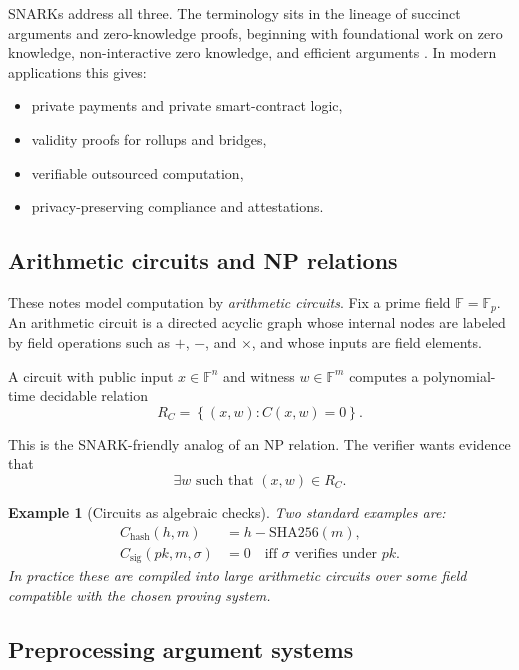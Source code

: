 \documentclass[11pt]{article}
\newcommand{\F}{\mathbb{F}}
\newcommand{\set}[1]{\left\{#1\right\}}
\newtheorem{example}{Example}
\begin{document}
SNARKs address all three. The terminology sits in the lineage of succinct arguments and zero-knowledge proofs, beginning with foundational work on zero knowledge, non-interactive zero knowledge, and efficient arguments \cite{GoldwasserMicaliRackoff1989,BlumFeldmanMicali1988,Kilian1992}. In modern applications this gives:
\begin{itemize}[leftmargin=2em]
    \item private payments and private smart-contract logic,
    \item validity proofs for rollups and bridges,
    \item verifiable outsourced computation,
    \item privacy-preserving compliance and attestations.
\end{itemize}

\subsection{Arithmetic circuits and NP relations}

These notes model computation by \emph{arithmetic circuits}. Fix a prime field $\F=\F_p$. An arithmetic circuit is a directed acyclic graph whose internal nodes are labeled by field operations such as $+$, $-$, and $\times$, and whose inputs are field elements.

A circuit with public input $x\in \F^n$ and witness $w\in \F^m$ computes a polynomial-time decidable relation
\[
R_C = \set{(x,w) : C(x,w)=0}.
\]

This is the SNARK-friendly analog of an NP relation. The verifier wants evidence that
\[
\exists w \text{ such that } (x,w)\in R_C.
\]

\begin{example}[Circuits as algebraic checks]
Two standard examples are:
\begin{align*}
C_{\mathrm{hash}}(h,m) &= h - \mathrm{SHA256}(m),\\
C_{\mathrm{sig}}(pk,m,\sigma) &= 0 \quad \text{iff } \sigma \text{ verifies under } pk.
\end{align*}
In practice these are compiled into large arithmetic circuits over some field compatible with the chosen proving system.
\end{example}

\subsection{Preprocessing argument systems}
\end{document}
